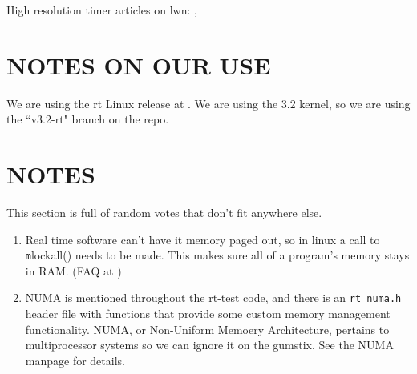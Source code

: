 \documentclass{article}
\begin{document}
High resolution timer articles on lwn: \cite{highResTimerAPI}, \cite{newApproachToKernelTimers}

\section{NOTES ON OUR USE}
We are using the rt Linux release at \cite{RealTimeLinuxPatch}.  We are using the 3.2 kernel, so we are using the ``v3.2-rt" branch on the repo.

\section{NOTES}
This section is full of random votes that don't fit anywhere else.
\begin{enumerate}
\item Real time software can't have it memory paged out, so in linux a call to {\texttt mlockall()} needs to be made.  This makes sure all of a program's memory stays in RAM. (FAQ at \cite{RealTimeLinux})
\item NUMA is mentioned throughout the rt-test code, and there is an \texttt{rt\_numa.h} header file with functions that provide some custom memory management functionality.  NUMA, or Non-Uniform Memoery Architecture, pertains to multiprocessor systems so we can ignore it on the gumstix.  See the NUMA manpage \cite{NUMA} for details.
\end{enumerate}

\end{document}
